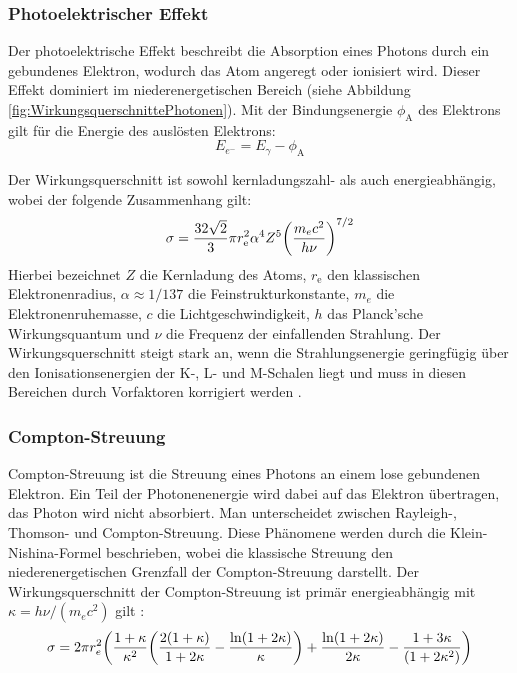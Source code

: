 		\subsubsection{Photoelektrischer Effekt}
		Der photoelektrische Effekt beschreibt die Absorption eines Photons durch ein gebundenes Elektron, wodurch das Atom angeregt oder ionisiert wird. Dieser Effekt dominiert im niederenergetischen Bereich (siehe Abbildung \ref{fig:WirkungsquerschnittePhotonen}). Mit der Bindungsenergie $\phi_{\text{A}}$ des Elektrons gilt für die Energie des auslösten Elektrons:
		\begin{equation*}
			E_{e^{-}}= E_{\gamma}-\phi_{\text{A}}
		\end{equation*} 
		
		\noindent Der Wirkungsquerschnitt ist sowohl kernladungszahl- als auch energieabhängig, wobei der folgende Zusammenhang gilt:
		\begin{equation*}
			\sigma= \frac{32\sqrt{2}}{3} \pi r_{\text{e}}^{2} \alpha^{4} Z^{5} \qty(\frac{m_{e}c^{2}}{h \nu})^{7/2}
		\end{equation*}
		Hierbei bezeichnet $Z$ die Kernladung des Atoms, $r_{\text{e}}$ den klassischen Elektronenradius, $\alpha\approx 1/137$ die Feinstrukturkonstante, $m_{e}$ die Elektronenruhemasse, $c$ die Lichtgeschwindigkeit, $h$ das Planck'sche Wirkungsquantum und $\nu$ die Frequenz der einfallenden Strahlung. Der Wirkungsquerschnitt steigt stark an, wenn die Strahlungsenergie geringfügig über den Ionisationsenergien der K-, L- und M-Schalen liegt und muss in diesen Bereichen durch Vorfaktoren korrigiert werden \cite{Leo}.

		
		
		\subsubsection{Compton-Streuung}
		Compton-Streuung ist die Streuung eines Photons an einem lose gebundenen Elektron. Ein Teil der Photonenenergie wird dabei auf das Elektron übertragen, das Photon wird nicht absorbiert. Man unterscheidet zwischen Rayleigh-, Thomson- und Compton-Streuung. Diese Phänomene werden durch die Klein-Nishina-Formel beschrieben, wobei die klassische Streuung den niederenergetischen Grenzfall der Compton-Streuung darstellt. Der Wirkungsquerschnitt der Compton-Streuung ist primär energieabhängig mit $\kappa=h\nu /(m_{e}c^{2})$ gilt  \cite{Leo}:
		\begin{equation*}
			\sigma= 2\pi r_{e}^{2} \qty(\frac{1+\kappa}{\kappa^{2}} \qty(\frac{2(1+\kappa)}{1+2\kappa}-\frac{\ln(1+2\kappa)}{\kappa})+\frac{\ln(1+2\kappa)}{2\kappa}-\frac{1+3\kappa}{(1+2\kappa^{2})})
		\end{equation*}
		
